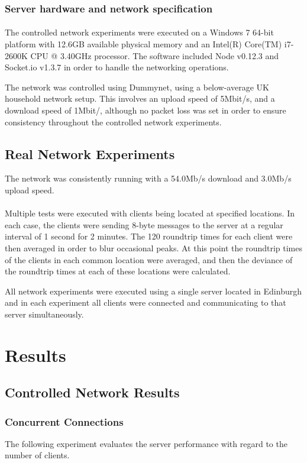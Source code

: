 \documentclass[bsc,frontabs,twoside,singlespacing,parskip,deptreport]{infthesis}     %
\begin{document}
\subsubsection{Server hardware and network specification}
\paragraph{}The controlled network experiments were executed on a Windows 7 64-bit platform with 12.6GB available physical memory and an Intel(R) Core(TM) i7-2600K CPU @ 3.40GHz processor. The software included Node v0.12.3 and Socket.io v1.3.7 in order to handle the networking operations.

The network was controlled using Dummynet, using a below-average UK household network setup. This involves an upload speed of 5Mbit/s, and a download speed of 1Mbit/, although no packet loss was set in order to ensure consistency throughout the controlled network experiments.

\subsection{Real Network Experiments}
The network was consistently running with a 54.0Mb/s download and 3.0Mb/s upload speed.
\paragraph{}Multiple tests were executed with clients being located at specified locations. In each case, the clients were sending 8-byte messages to the server at a regular interval of 1 second for 2 minutes. The 120 roundtrip times for each client were then averaged in order to blur occasional peaks. At this point the roundtrip times of the clients in each common location were averaged, and then the deviance of the roundtrip times at each of these locations were calculated.

All network experiments were executed using a single server located in Edinburgh and in each experiment all clients were connected and communicating to that server simultaneously.

\section{Results}
\subsection{Controlled Network Results}
\subsubsection{Concurrent Connections}
The following experiment evaluates the server performance with regard to the number of clients.
\end{document}
